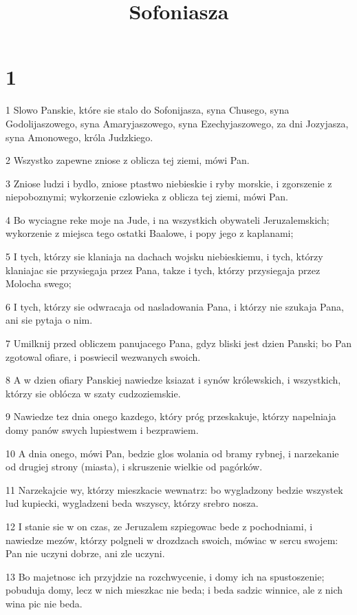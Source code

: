 

\title{Sofoniasza}


\chapter{1}

\par 1 Slowo Panskie, które sie stalo do Sofonijasza, syna Chusego, syna Godolijaszowego, syna Amaryjaszowego, syna Ezechyjaszowego, za dni Jozyjasza, syna Amonowego, króla Judzkiego.
\par 2 Wszystko zapewne zniose z oblicza tej ziemi, mówi Pan.
\par 3 Zniose ludzi i bydlo, zniose ptastwo niebieskie i ryby morskie, i zgorszenie z niepoboznymi; wykorzenie czlowieka z oblicza tej ziemi, mówi Pan.
\par 4 Bo wyciagne reke moje na Jude, i na wszystkich obywateli Jeruzalemskich; wykorzenie z miejsca tego ostatki Baalowe, i popy jego z kaplanami;
\par 5 I tych, którzy sie klaniaja na dachach wojsku niebieskiemu, i tych, którzy klaniajac sie przysiegaja przez Pana, takze i tych, którzy przysiegaja przez Molocha swego;
\par 6 I tych, którzy sie odwracaja od nasladowania Pana, i którzy nie szukaja Pana, ani sie pytaja o nim.
\par 7 Umilknij przed obliczem panujacego Pana, gdyz bliski jest dzien Panski; bo Pan zgotowal ofiare, i poswiecil wezwanych swoich.
\par 8 A w dzien ofiary Panskiej nawiedze ksiazat i synów królewskich, i wszystkich, którzy sie oblócza w szaty cudzoziemskie.
\par 9 Nawiedze tez dnia onego kazdego, który próg przeskakuje, którzy napelniaja domy panów swych lupiestwem i bezprawiem.
\par 10 A dnia onego, mówi Pan, bedzie glos wolania od bramy rybnej, i narzekanie od drugiej strony (miasta), i skruszenie wielkie od pagórków.
\par 11 Narzekajcie wy, którzy mieszkacie wewnatrz: bo wygladzony bedzie wszystek lud kupiecki, wygladzeni beda wszyscy, którzy srebro nosza.
\par 12 I stanie sie w on czas, ze Jeruzalem szpiegowac bede z pochodniami, i nawiedze mezów, którzy polgneli w drozdzach swoich, mówiac w sercu swojem: Pan nie uczyni dobrze, ani zle uczyni.
\par 13 Bo majetnosc ich przyjdzie na rozchwycenie, i domy ich na spustoszenie; pobuduja domy, lecz w nich mieszkac nie beda; i beda sadzic winnice, ale z nich wina pic nie beda.

